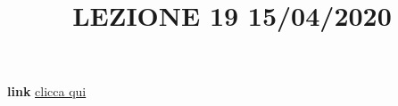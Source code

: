 \newline
\newline
\title{LEZIONE 19 15/04/2020}\newline
\textbf{link} \href{https://web.microsoftstream.com/video/8edecaf9-c042-4da8-905e-0412c9f62daa?list=user&userId=faa91214-a6f5-40d7-8875-253fd49b8ce1}{clicca qui}